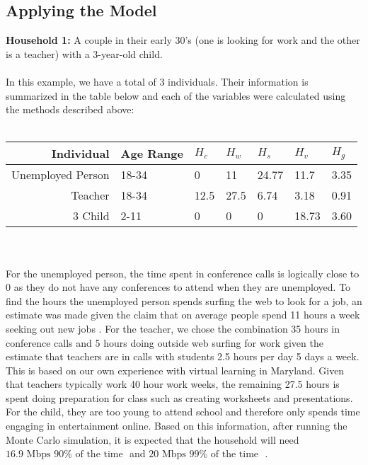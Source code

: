 \documentclass[12pt]{article}
\begin{document}
\subsection{Applying the Model}
\textbf{Household 1:} A couple in their early 30’s (one is looking for work and the other is a teacher) with a 3-year-old child.
\\
\\
In this example, we have a total of 3 individuals. Their information is summarized in the table below and each of the variables were calculated using the methods described above:
\\
\\
\begin{tabular}{|r|p{1in}|p{0.57in}|p{0.57in}|p{0.57in}|p{0.57in}|p{0.57in}|}
\hline
\textbf{Individual} & Age Range & \textbf{$H_c$} & \textbf{$H_w$} & \textbf{$H_s$} & \textbf{$H_v$} & \textbf{$H_g$}
\\
\hline
Unemployed Person & 18-34 & 0 & 11 & 24.77 & 11.7 & 3.35
\\
\hline
Teacher & 18-34 & 12.5 & 27.5 & 6.74 & 3.18 & 0.91
\\
\hline3
Child & 2-11 & 0 & 0 & 0 & 18.73 & 3.60
\\
\hline
\end{tabular}
\\
\\
For the unemployed person, the time spent in conference calls is logically close to 0 as they do not have any conferences to attend when they are unemployed. To find the hours the unemployed person spends surfing the web to look for a job, an estimate was made given the claim that on average people spend 11 hours a week seeking out new jobs \cite{unemployment}. For the teacher, we chose the combination 35 hours in conference calls and 5 hours doing outside web surfing for work given the estimate that teachers are in calls with students 2.5 hours per day 5 days a week. This is based on our own experience with virtual learning in Maryland. Given that teachers typically work 40 hour work weeks, the remaining 27.5 hours is spent doing preparation for class such as creating worksheets and presentations. For the child, they are too young to attend school and therefore only spends time engaging in entertainment online. Based on this information, after running the Monte Carlo simulation, it is expected that the household will need $\boxed{16.9 \text{ Mbps } 90\% \text{ of the time }}$ and $\boxed{20 \text{ Mbps } 99\% \text{ of the time }}$ .
\\
\\
\end{document}
